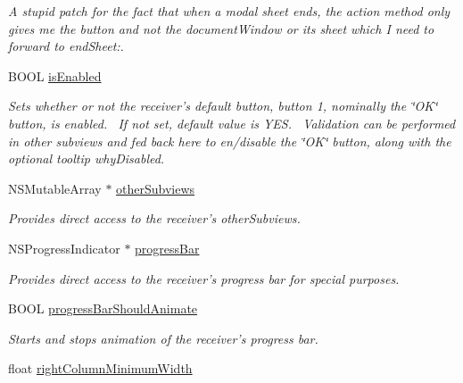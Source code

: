 \begin{CompactItemize}
\begin{CompactList}\small\item\em A stupid patch for the fact that when a modal sheet ends, the action method only gives me the button and not the documentWindow or its sheet which I need to forward to endSheet:. \item\end{CompactList}\item 
\hypertarget{interface_s_s_y_alert_ee3533c790c49bc3124d1aef4a5146b6}{
BOOL \hyperlink{interface_s_s_y_alert_ee3533c790c49bc3124d1aef4a5146b6}{isEnabled}}
\label{interface_s_s_y_alert_ee3533c790c49bc3124d1aef4a5146b6}

\begin{CompactList}\small\item\em Sets whether or not the receiver's default button, button 1, nominally the \char`\"{}OK\char`\"{} button, is enabled.~ If not set, default value is YES.~ Validation can be performed in other subviews and fed back here to en/disable the \char`\"{}OK\char`\"{} button, along with the optional tooltip whyDisabled. \item\end{CompactList}\item 
NSMutableArray $\ast$ \hyperlink{interface_s_s_y_alert_eb559c5354ac41e9143ac2970de5addc}{otherSubviews}
\begin{CompactList}\small\item\em Provides direct access to the receiver's otherSubviews. \item\end{CompactList}\item 
NSProgressIndicator $\ast$ \hyperlink{interface_s_s_y_alert_cc8eac2be6bd9cc10999af6b51994082}{progressBar}
\begin{CompactList}\small\item\em Provides direct access to the receiver's progress bar for special purposes. \item\end{CompactList}\item 
BOOL \hyperlink{interface_s_s_y_alert_57507576c298844a045e2e9a9fb2ce0c}{progressBarShouldAnimate}
\begin{CompactList}\small\item\em Starts and stops animation of the receiver's progress bar. \item\end{CompactList}\item 
float \hyperlink{interface_s_s_y_alert_69975a8b700fb1d2985b2794e0120e2f}{rightColumnMinimumWidth}

\end{CompactItemize}
